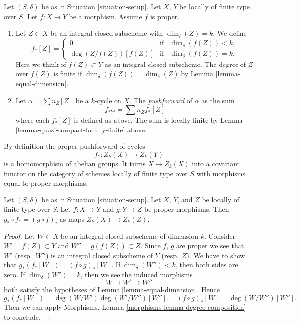 \begin{definition}
\label{definition-proper-pushforward}
Let $(S, \delta)$ be as in Situation \ref{situation-setup}.
Let $X$, $Y$ be locally of finite type over $S$.
Let $f : X \to Y$ be a morphism.
Assume $f$ is proper.
\begin{enumerate}
\item Let $Z \subset X$ be an integral closed subscheme
with $\dim_\delta(Z) = k$. We define
$$
f_*[Z] =
\left\{
\begin{matrix}
0 & \text{if} & \dim_\delta(f(Z))< k, \\
\deg(Z/f(Z)) [f(Z)] & \text{if} & \dim_\delta(f(Z)) = k.
\end{matrix}
\right.
$$
Here we think of $f(Z) \subset Y$ as an integral closed subscheme.
The degree of $Z$ over $f(Z)$ is finite if
$\dim_\delta(f(Z)) = \dim_\delta(Z)$
by Lemma \ref{lemma-equal-dimension}.
\item Let $\alpha = \sum n_Z [Z]$ be a $k$-cycle on $X$. The
{\it pushforward} of $\alpha$ as the sum
$$
f_* \alpha = \sum n_Z f_*[Z]
$$
where each $f_*[Z]$ is defined as above. The sum is locally finite
by Lemma \ref{lemma-quasi-compact-locally-finite} above.
\end{enumerate}
\end{definition}

\noindent
By definition the proper pushforward of cycles
$$
f_* : Z_k(X) \longrightarrow Z_k(Y)
$$
is a homomorphism of abelian groups. It turns $X \mapsto Z_k(X)$
into a covariant functor on the category of schemes locally of
finite type over $S$ with morphisms equal to proper morphisms.

\begin{lemma}
\label{lemma-compose-pushforward}
Let $(S, \delta)$ be as in Situation \ref{situation-setup}.
Let $X$, $Y$, and $Z$ be locally of finite type over $S$.
Let $f : X \to Y$ and $g : Y \to Z$ be proper morphisms.
Then $g_* \circ f_* = (g \circ f)_*$ as maps $Z_k(X) \to Z_k(Z)$.
\end{lemma}

\begin{proof}
Let $W \subset X$ be an integral closed subscheme of dimension $k$.
Consider $W' = f(Z) \subset Y$ and $W'' = g(f(Z)) \subset Z$.
Since $f$, $g$ are proper we see that $W'$ (resp.\ $W''$) is
an integral closed subscheme of $Y$ (resp.\ $Z$).
We have to show that $g_*(f_*[W]) = (f \circ g)_*[W]$.
If $\dim_\delta(W'') < k$, then both sides are zero.
If $\dim_\delta(W'') = k$, then we see the induced morphisms
$$
W \longrightarrow
W' \longrightarrow
W''
$$
both satisfy the hypotheses of Lemma \ref{lemma-equal-dimension}. Hence
$$
g_*(f_*[W]) = \deg(W/W')\deg(W'/W'')[W''],
\quad
(f \circ g)_*[W] = \deg(W/W'')[W''].
$$
Then we can apply
Morphisms, Lemma \ref{morphisms-lemma-degree-composition}
to conclude.
\end{proof}


